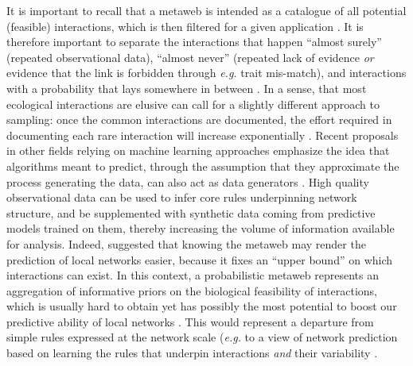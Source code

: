 It is important to recall that a metaweb is intended as a catalogue of
all potential (feasible) interactions, which is then filtered for a
given application \cite{Morales-Castilla2015Inferring}. It is therefore
important to separate the interactions that happen ``almost surely''
(repeated observational data), ``almost never'' (repeated lack of
evidence \emph{or} evidence that the link is forbidden through
\emph{e.g.} trait mis-match), and interactions with a probability that
lays somewhere in between \cite{Catchen2023Missing}. In a sense, that
most ecological interactions are elusive can call for a slightly
different approach to sampling: once the common interactions are
documented, the effort required in documenting each rare interaction
will increase exponentially \cite{Jordano2016Sampling}. Recent proposals
in other fields relying on machine learning approaches emphasize the
idea that algorithms meant to predict, through the assumption that they
approximate the process generating the data, can also act as data
generators \cite{Hoffmann2019Machine}. High quality observational data
can be used to infer core rules underpinning network structure, and be
supplemented with synthetic data coming from predictive models trained
on them, thereby increasing the volume of information available for
analysis. Indeed, \cite{Strydom2021Roadmap} suggested that knowing the metaweb
may render the prediction of local networks easier, because it fixes an
``upper bound'' on which interactions can exist. In this context, a
probabilistic metaweb represents an aggregation of informative priors on
the biological feasibility of interactions, which is usually hard to
obtain yet has possibly the most potential to boost our predictive
ability of local networks \cite{Bartomeus2013Understanding,
Bartomeus2016Common}. This would represent a departure from simple
rules expressed at the network scale (\emph{e.g.} \cite{Williams2000Simple} to
a view of network prediction based on learning the rules that underpin
interactions \emph{and} their variability
\cite{Gupta2022Simultaneously}.

